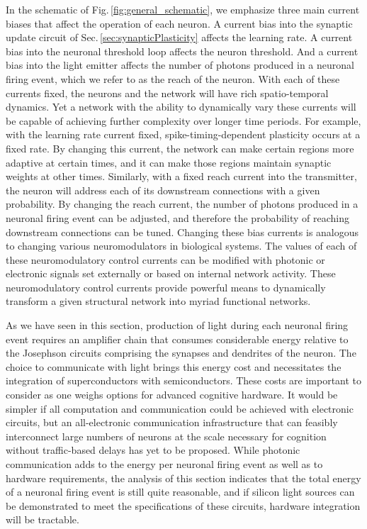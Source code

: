\documentclass[aip,amsmath,amssymb,reprint,nofootinbib]{revtex4-1}
\begin{document}
In the schematic of Fig.\,\ref{fig:general_schematic}, we emphasize three main current biases that affect the operation of each neuron. A current bias into the synaptic update circuit of Sec.\,\ref{sec:synapticPlasticity} affects the learning rate. A current bias into the neuronal threshold loop affects the neuron threshold. And a current bias into the light emitter affects the number of photons produced in a neuronal firing event, which we refer to as the reach of the neuron. With each of these currents fixed, the neurons and the network will have rich spatio-temporal dynamics. Yet a network with the ability to dynamically vary these currents will be capable of achieving further complexity over longer time periods. For example, with the learning rate current fixed, spike-timing-dependent plasticity occurs at a fixed rate. By changing this current, the network can make certain regions more adaptive at certain times, and it can make those regions maintain synaptic weights at other times. Similarly, with a fixed reach current into the transmitter, the neuron will address each of its downstream connections with a given probability. By changing the reach current, the number of photons produced in a neuronal firing event can be adjusted, and therefore the probability of reaching downstream connections can be tuned. Changing these bias currents is analogous to changing various neuromodulators in biological systems. The values of each of these neuromodulatory control currents can be modified with photonic or electronic signals set externally or based on internal network activity. These neuromodulatory control currents provide powerful means to dynamically transform a given structural network into myriad functional networks.

As we have seen in this section, production of light during each neuronal firing event requires an amplifier chain that consumes considerable energy relative to the Josephson circuits comprising the synapses and dendrites of the neuron. The choice to communicate with light brings this energy cost and necessitates the integration of superconductors with semiconductors. These costs are important to consider as one weighs options for advanced cognitive hardware. It would be simpler if all computation and communication could be achieved with electronic circuits, but an all-electronic communication infrastructure that can feasibly interconnect large numbers of neurons at the scale necessary for cognition without traffic-based delays has yet to be proposed. While photonic communication adds to the energy per neuronal firing event as well as to hardware requirements, the analysis of this section indicates that the total energy of a neuronal firing event is still quite reasonable, and if silicon light sources can be demonstrated to meet the specifications of these circuits, hardware integration will be tractable.
\end{document}
